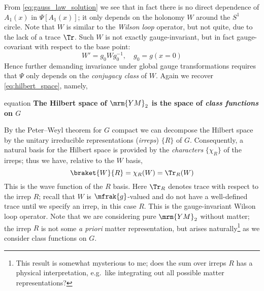 \documentclass[a4paper
	,10pt
]{article}
\newcommand{\YM}{{\ensuremath{\mrm{YM}_2}}\xspace}
\begin{document}
	From \eqref{eq:gauss_law_solution} we see that in fact there is no direct dependence of $A_1(x)$ in $\Psi[A_1(x)]$; it only depends on the holonomy $W$ around the $S^1$ circle. Note that $W$ is similar to the \textit{Wilson loop} operator, but not quite, due to the lack of a trace $\Tr$. Such $W$ is not exactly gauge-invariant, but in fact gauge-covariant with respect to the base point:
	\begin{equation}
		W' = g_0 W g_0^{-1},
	\quad
		g_0 = g(x = 0)
	\end{equation}
	Hence further demanding invariance under global gauge transformations requires that $\Psi$ only depends on the \textit{conjugacy class} of $W$. Again we recover \eqref{eq:hilbert_space}, namely,
	\begin{empheq}{equation}
		\textbf{
			The Hilbert space of \YM is the space of \textit{class functions} on $G$
		}
	\end{empheq}
	
	By the Peter--Weyl theorem for $G$ compact we can decompose the Hilbert space by the unitary irreducible representations (\textit{irreps}) $\{R\}$ of $G$. 
	Consequently, a natural basis for the Hilbert space is provided by the \textit{characters} $\{\chi_R\}$ of the irreps; thus we have, relative to the $W$ basis,
	\begin{equation}
		\braket{W}{R}
		= \chi_R (W)
		= \Tr_R (W)
	\end{equation}
	This is the wave function of the $R$ basis.
	Here $\Tr_R$ denotes trace with respect to the irrep $R$; recall that $W$ is $\mfrak{g}$-valued and do not have a well-defined trace until we specify an irrep, in this case $R$. This is the gauge-invariant Wilson loop operator. Note that we are considering pure \YM without matter; the irrep $R$ is not some \textit{a priori} matter representation, but arises naturally\footnote{
		This result is somewhat mysterious to me; does the sum over irreps $R$ has a physical interpretation, e.g.~like integrating out all possible matter representations?
	} as we consider class functions on $G$.
\end{document}
